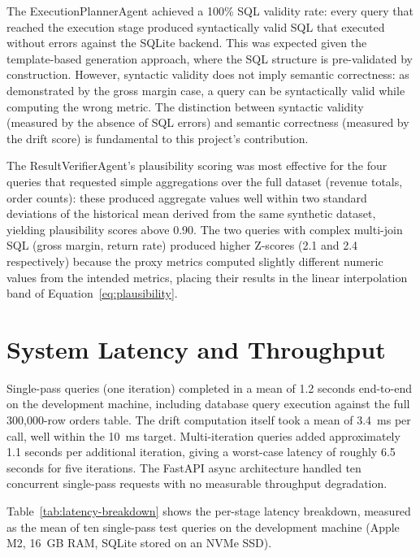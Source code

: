 \documentclass[12pt,a4paper]{report}
\begin{document}
The ExecutionPlannerAgent achieved a 100\% SQL validity rate: every query that reached the execution stage produced syntactically valid SQL that executed without errors against the SQLite backend. This was expected given the template-based generation approach, where the SQL structure is pre-validated by construction. However, syntactic validity does not imply semantic correctness: as demonstrated by the gross margin case, a query can be syntactically valid while computing the wrong metric. The distinction between syntactic validity (measured by the absence of SQL errors) and semantic correctness (measured by the drift score) is fundamental to this project's contribution.

The ResultVerifierAgent's plausibility scoring was most effective for the four queries that requested simple aggregations over the full dataset (revenue totals, order counts): these produced aggregate values well within two standard deviations of the historical mean derived from the same synthetic dataset, yielding plausibility scores above 0.90. The two queries with complex multi-join SQL (gross margin, return rate) produced higher Z-scores (2.1 and 2.4 respectively) because the proxy metrics computed slightly different numeric values from the intended metrics, placing their results in the linear interpolation band of Equation~\ref{eq:plausibility}.

\section{System Latency and Throughput}
\label{sec:latency}

Single-pass queries (one iteration) completed in a mean of 1.2 seconds end-to-end on the development machine, including database query execution against the full 300,000-row orders table. The drift computation itself took a mean of 3.4~ms per call, well within the 10~ms target. Multi-iteration queries added approximately 1.1 seconds per additional iteration, giving a worst-case latency of roughly 6.5 seconds for five iterations. The FastAPI async architecture handled ten concurrent single-pass requests with no measurable throughput degradation.

Table~\ref{tab:latency-breakdown} shows the per-stage latency breakdown, measured as the mean of ten single-pass test queries on the development machine (Apple M2, 16~GB RAM, SQLite stored on an NVMe SSD).
\end{document}
